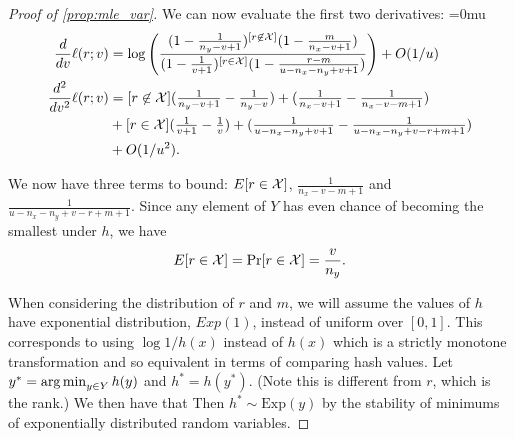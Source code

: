 \begin{proof}[Proof of \cref{prop:mle_var}]


   We can now evaluate the first two derivatives:
   {
      \thinmuskip=0mu
      \begin{align}
         \frac{d}{dv}\ell(r;v)
         &=
         \log\left(\frac{(1-\frac1{n_y-v+1})^{[r\not\in\mathcal{X}]}(1-\frac{m}{n_x-v+1})}{(1-\frac 1{v+1})^{[r\in\mathcal{X}]}(1-\frac{r-m}{u-n_x-n_y+v+1})}\right) + O(1/u)
         \label{eq:deriv1}
         \\
         \frac{d^2}{dv^2}\ell(r;v)
        &=
          [r\not\in\mathcal{X}](\tfrac1{n_y-v+1}-\tfrac1{n_y-v})
         + (\tfrac1{n_x-v+1}-\tfrac1{n_x-v-m+1})
      \\&+[r\in\mathcal{X}](\tfrac1{v+1}-\tfrac1{v})
         + (\tfrac1{u-n_x-n_y+v+1}-\tfrac1{u-n_x-n_y+v-r+m+1})
      \\&+ O(1/u^2)
         \label{eq:deriv2}
         .
      \end{align}
      \vspace{-1em}
   }

   We now have three terms to bound:
   $E[r\in\mathcal{X}]$, $\tfrac1{n_x-v-m+1}$ and $\tfrac1{u-n_x-n_y+v-r+m+1}$.
   Since any element of $Y$ has even chance of becoming the smallest under $h$, we have
   \[E[r\in\mathcal{X}] = \Pr[r\in\mathcal{X}] = \frac{v}{n_y}. \]

   When considering the distribution of $r$ and $m$, we will assume the values of $h$ have exponential distribution, $Exp(1)$, instead of uniform over $[0,1]$.
   This corresponds to using $\log1/h(x)$ instead of $h(x)$ which is a strictly monotone transformation and so equivalent in terms of comparing hash values.
   Let $y^* = \operatorname*{arg\,min}_{y\in Y}h(y)$ and $h^* = h(y^*)$.
   (Note this is different from $r$, which is the rank.)
   We then have that Then $h^* \sim \text{Exp}(y)$ by the stability of minimums of exponentially distributed random variables.


\end{proof}
